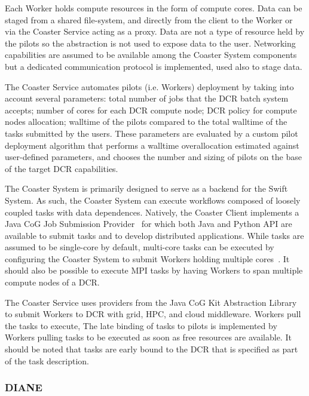 \documentclass{sig-alternate}
\begin{document}

Each Worker holds compute resources in the form of compute cores. Data can be
staged from a shared file-system, and directly from the client to the Worker or
via the Coaster Service acting as a proxy. Data are not a type of resource held
by the pilots so the \pilot abstraction is not used to expose data to the user.
Networking capabilities are assumed to be available among the Coaster System
components but a dedicated communication protocol is implemented, used also to
stage data.

The Coaster Service automates pilots (i.e. Workers) deployment by taking into
account several parameters: total number of jobs that the DCR batch system
accepts; number of cores for each DCR compute node; DCR policy for compute nodes
allocation; walltime of the pilots compared to the total walltime of the tasks
submitted by the users. These parameters are evaluated by a custom pilot
deployment algorithm that performs a walltime overallocation estimated against
user-defined parameters, and chooses the number and sizing of pilots on the base
of the target DCR capabilities.

The Coaster System is primarily designed to serve as a \pilot backend for the
Swift System. As such, the Coaster System can execute workflows composed of
loosely coupled tasks with data dependences. Natively, the Coaster Client
implements a Java CoG Job Submission Provider~\cite{von2000cog,cog_url} for
which both Java and Python API are available to submit tasks and to develop
distributed applications. While tasks are assumed to be single-core by default,
multi-core tasks can be executed by configuring the Coaster System to submit
Workers holding multiple cores~\cite{swift_guide_url}. It should also be
possible to execute MPI tasks by having Workers to span multiple compute nodes
of a DCR.

The Coaster Service uses providers from the Java CoG Kit Abstraction Library to
submit Workers to DCR with grid, HPC, and cloud middleware. Workers pull the
tasks to execute, The late binding of tasks to pilots is implemented by Workers
pulling tasks to be executed as soon as free resources are available. It should
be noted that tasks are early bound to the DCR that is specified as part of the
task description.

%
\subsubsection{DIANE}\label{sec:diane}
\end{document}
